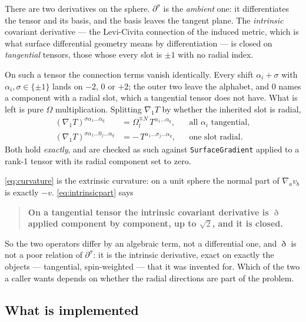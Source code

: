 \documentclass[11pt,a4paper]{article}
\newcommand{\code}[1]{\texttt{#1}}
\begin{document}
There are two derivatives on the sphere.  $\partial^\sigma$ is the
\emph{ambient} one: it differentiates the tensor and its basis, and the basis
leaves the tangent plane.  The \emph{intrinsic} covariant derivative --- the
Levi-Civita connection of the induced metric, which is what surface
differential geometry means by differentiation --- is closed on
\emph{tangential} tensors, those whose every slot is $\pm1$ with no radial
index.

On such a tensor the connection terms vanish identically.  Every shift
$\alpha_i + \sigma$ with $\alpha_i,\sigma \in \{\pm1\}$ lands on $-2$, $0$ or
$+2$; the outer two leave the alphabet, and $0$ names a component with a
radial slot, which a tangential tensor does not have.  What is left is pure
$\Omega$ multiplication.  Splitting $\nabla_1 T$ by whether the inherited slot
is radial,
\begin{align}
  (\nabla_1 T)^{\sigma \alpha_1\ldots\alpha_q}
    &= \Omega^{\mp N}_{l}\, T^{\alpha_1\ldots\alpha_q},
    &&\text{all } \alpha_i \text{ tangential},
    \label{eq:intrinsicpart}\\
  (\nabla_1 T)^{\sigma \alpha_1\ldots 0_j \ldots\alpha_q}
    &= -\,T^{\alpha_1\ldots \sigma_j \ldots\alpha_q},
    &&\text{one slot radial}.
    \label{eq:curvature}
\end{align}
Both hold \emph{exactly}, and are checked as such against
\code{SurfaceGradient} applied to a rank-1 tensor with its radial component
set to zero.

\eqref{eq:curvature} is the extrinsic curvature: on a unit sphere the normal
part of $\nabla_a v_b$ is exactly $-v$.  \eqref{eq:intrinsicpart} says

\begin{quote}
  \textbf{On a tangential tensor the intrinsic covariant derivative is $\eth$
  applied component by component, up to $\sqrt2$, and it is closed.}
\end{quote}

So the two operators differ by an algebraic term, not a differential one, and
$\eth$ is not a poor relation of $\partial^\sigma$: it is the intrinsic
derivative, exact on exactly the objects --- tangential, spin-weighted --- that
it was invented for.  Which of the two a caller wants depends on whether the
radial directions are part of the problem.

\subsection{What is implemented}
\end{document}
